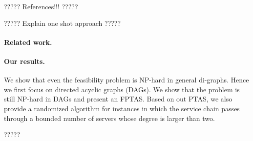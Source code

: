 ????? References!!! ?????

?????  Explain one shot approach ?????

\paragraph*{\bf Related work.}
%



\paragraph*{\bf Our results.}
%
We show that even the feasibility problem is NP-hard in general
di-graphs.  Hence we first focus on directed acyclic graphs (DAGs).
We show that the problem is still NP-hard in DAGs and present an
FPTAS.
%
Based on out PTAS, we also provide a randomized algorithm for
instances in which the service chain passes through a bounded number
of servers whose degree is larger than two.

?????

\bigskip




